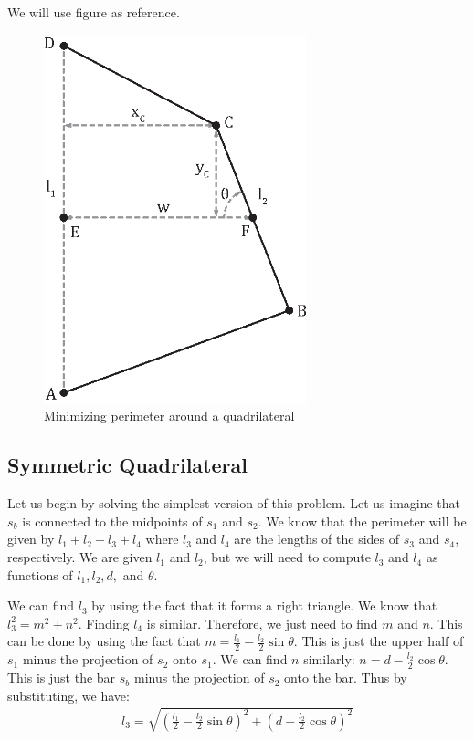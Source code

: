 \documentclass[12pt]{amsart}   %
\begin{document}
We will use figure \label{fig:quadrilateral} as reference.

\begin{figure}
  \includegraphics[width=3in]{figures/quad.eps}
  \caption{Minimizing perimeter around a quadrilateral}
\end{figure}

\subsection{Symmetric Quadrilateral}

Let us begin by solving the simplest version of this problem. Let us imagine that $s_b$ is connected to the midpoints of $s_1$ and $s_2$. We know that the perimeter will be given by $l_1 + l_2 + l_3 + l_4$ where $l_3$ and $l_4$ are the lengths of the sides of $s_3$ and $s_4$, respectively. We are given $l_1$ and $l_2$, but we will need to compute $l_3$ and $l_4$ as functions of $l_1, l_2,d, $ and $\theta$. 

We can find $l_3$ by using the fact that it forms a right triangle. We know that $l_3^2 = m^2 + n^2$. Finding $l_4$ is similar. Therefore, we just need to find $m$ and $n$. This can be done by using the fact that $m = \frac{l_1}{2} - \frac{l_2}{2} \sin \theta$. This is just the upper half of $s_1$ minus the projection of $s_2$ onto $s_1$. We can find $n$ similarly: $n = d - \frac{l_2}{2} \cos \theta$. This is just the bar $s_b$ minus the projection of $s_2$ onto the bar. Thus by substituting, we have:
\begin{eqnarray}
  l_3 = \sqrt{ \left(\frac{l_1}{2} - \frac{l_2}{2} \sin \theta \right)^2 + \left( d - \frac{l_2}{2} \cos \theta \right)^2 }
\end{eqnarray}
\end{document}
